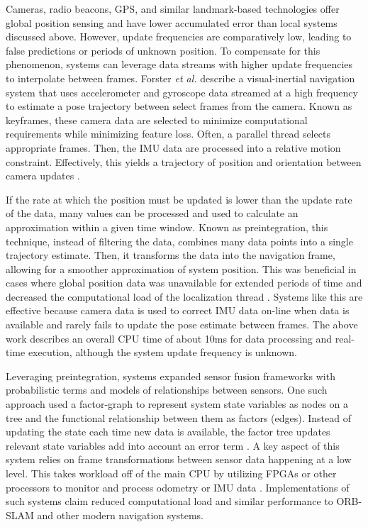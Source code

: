 \documentclass{article}
\begin{document}
	Cameras, radio beacons, GPS, and similar landmark-based technologies offer global position sensing and have lower accumulated error than local systems discussed above. However, update frequencies are comparatively low, leading to false predictions or periods of unknown position. To compensate for this phenomenon, systems can leverage data streams with higher update frequencies to interpolate between frames. Forster \textit{et al.} describe a visual-inertial navigation system that uses accelerometer and gyroscope data streamed at a high frequency to estimate a pose trajectory between select frames from the camera. Known as keyframes, these camera data are selected to minimize computational requirements while minimizing feature loss. Often, a parallel thread selects appropriate frames. Then, the IMU data are processed into a relative motion constraint. Effectively, this yields a trajectory of position and orientation between camera updates \cite{forster_CDS_15}.

    If the rate at which the position must be updated is lower than the update rate of the data, many values can be processed and used to calculate an approximation within a given time window. Known as preintegration, this technique, instead of filtering the data, combines many data points into a single trajectory estimate. Then, it transforms the data into the navigation frame, allowing for a smoother approximation of system position. This was beneficial in cases where global position data was unavailable for extended periods of time and decreased the computational load of the localization thread \cite{lupton_vian_2012}. Systems like this are effective because camera data is used to correct IMU data on-line when data is available and rarely fails to update the pose estimate between frames. The above work describes an overall CPU time of about 10ms for data processing and real-time execution, although the system update frequency is unknown.

    Leveraging preintegration, systems expanded sensor fusion frameworks with probabilistic terms and models of relationships between sensors. One such approach used a factor-graph to represent system state variables as nodes on a tree and the functional relationship between them as factors (edges). Instead of updating the state each time new data is available, the factor tree updates relevant state variables add into account an error term \cite{indelman_ifns_2013}. A key aspect of this system relies on frame transformations between sensor data happening at a low level. This takes workload off of the main CPU by utilizing FPGAs or other processors to monitor and process odometry or IMU data \cite{li_gyro_2017}. Implementations of such systems claim reduced computational load and similar performance to ORB-SLAM and other modern navigation systems.
\end{document}
